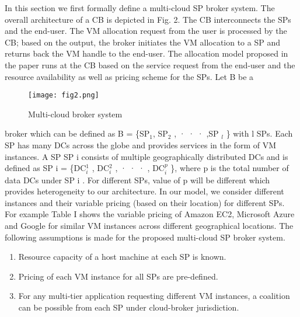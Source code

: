 \documentclass[12pt,a4paper,twoside,openright]{report}
\newcommand\tab[1][0.8cm]{\hspace*{#1}}
\begin{document}
\tab In this section we first formally define a multi-cloud SP
broker system. The overall architecture of a CB is depicted in
Fig. 2. The CB interconnects the SPs and the end-user. The
VM allocation request from the user is processed by the CB;
based on the output, the broker initiates the VM allocation to
a SP and returns back the VM handle to the end-user. The
allocation model proposed in the paper runs at the CB based
on the service request from the end-user and the resource
availability as well as pricing scheme for the SPs. Let B be a
\begin{figure}[htbp]
	\centerline{\texttt{[image: fig2.png]}}
	\caption{Multi-cloud broker system}
	\label{fig}
\end{figure}
\newline
broker which can be defined as B = \{SP${_{1}}$, SP${_{2}}$ , · · · ,SP ${_{l}}$ \}
with l SPs. Each SP has many DCs across the globe and
provides services in the form of VM instances. A SP SP i
consists of multiple geographically distributed DCs and is
defined as SP i = \{DC$^1_i$ , DC$^2_i$ , · · · , DC$^p_i$ \}, where p is the
total number of data DCs under SP i . For different SPs, value
of p will be different which provides heterogeneity to our architecture.  In our model, we
consider different instances and their variable pricing (based
on their location) for different SPs. For example Table I shows
the variable pricing of Amazon EC2, Microsoft Azure and
Google for similar VM instances across different geographical
locations. The following assumptions is made for the proposed
multi-cloud SP broker system.
\begin{enumerate}
	\item Resource capacity of a host machine at each SP is
	known.
	\item Pricing of each VM instance for all SPs are pre-defined.
	\item For any multi-tier application requesting different VM
	instances, a coalition can be possible from each SP under
	cloud-broker jurisdiction.
\end{enumerate}
\end{document}
